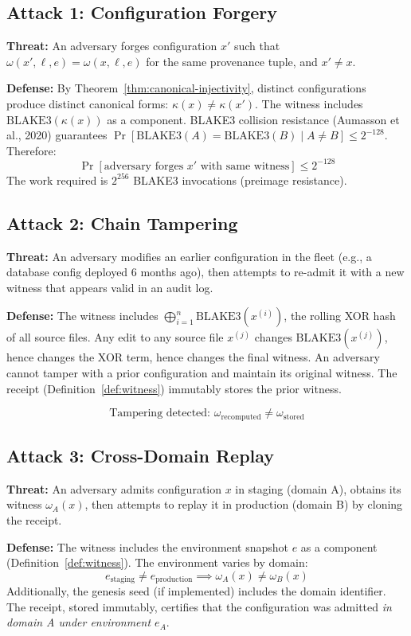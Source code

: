 \documentclass[12pt, letterpaper]{report}
\theoremstyle{plain}
\theoremstyle{definition}
\theoremstyle{remark}
\begin{document}
\subsection{Attack 1: Configuration Forgery}

\textbf{Threat:} An adversary forges configuration $x'$ such that
$\omega(x', \ell, e) = \omega(x, \ell, e)$ for the same provenance tuple,
and $x' \neq x$.

\textbf{Defense:}
By Theorem~\ref{thm:canonical-injectivity}, distinct configurations produce
distinct canonical forms: $\kappa(x) \neq \kappa(x')$.
The witness includes $\mathrm{BLAKE3}(\kappa(x))$ as a component.
BLAKE3 collision resistance (Aumasson et al., 2020) guarantees
$\Pr[\mathrm{BLAKE3}(A) = \mathrm{BLAKE3}(B) \mid A \neq B] \leq 2^{-128}$.
Therefore:
\[
  \Pr[\text{adversary forges } x' \text{ with same witness}] \leq 2^{-128}
\]
The work required is $2^{256}$ BLAKE3 invocations (preimage resistance).

\subsection{Attack 2: Chain Tampering}

\textbf{Threat:} An adversary modifies an earlier configuration in the fleet
(e.g., a database config deployed 6 months ago), then attempts to re-admit
it with a new witness that appears valid in an audit log.

\textbf{Defense:}
The witness includes $\bigoplus_{i=1}^{n} \mathrm{BLAKE3}(x^{(i)})$,
the rolling XOR hash of all source files.
Any edit to any source file $x^{(j)}$ changes $\mathrm{BLAKE3}(x^{(j)})$,
hence changes the XOR term, hence changes the final witness.
An adversary cannot tamper with a prior configuration and maintain its
original witness. The receipt (Definition~\ref{def:witness}) immutably
stores the prior witness.

\[
  \text{Tampering detected: } \omega_{\mathrm{recomputed}} \neq \omega_{\mathrm{stored}}
\]

\subsection{Attack 3: Cross-Domain Replay}

\textbf{Threat:} An adversary admits configuration $x$ in staging (domain A),
obtains its witness $\omega_A(x)$, then attempts to replay it in production
(domain B) by cloning the receipt.

\textbf{Defense:}
The witness includes the environment snapshot $e$ as a component
(Definition~\ref{def:witness}). The environment varies by domain:
\[
  e_{\mathrm{staging}} \neq e_{\mathrm{production}}
  \implies \omega_A(x) \neq \omega_B(x)
\]
Additionally, the genesis seed (if implemented) includes the domain identifier.
The receipt, stored immutably, certifies that the configuration was admitted
\emph{in domain A under environment $e_A$}.
\end{document}
